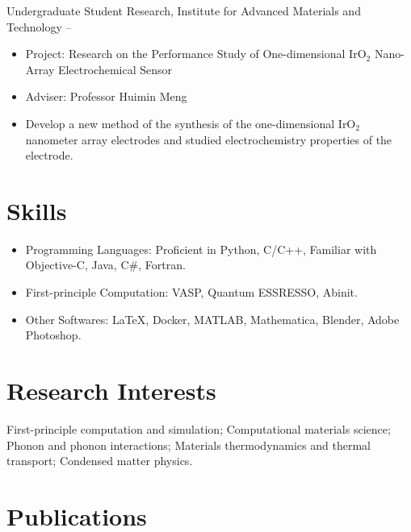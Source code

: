 \documentclass[
  a4paper,
  12pt
]{cv}
\begin{document}

\vspace{.25em}
Undergraduate Student Research, 
Institute for Advanced Materials and Technology
\hfill
{} --
\begin{itemize}
\item Project: Research on the Performance Study of One-dimensional IrO$_{2}$ Nano-Array Electrochemical Sensor
\item Adviser: Professor Huimin Meng
\item Develop a new method of the synthesis of the one-dimensional IrO$_{2}$ nanometer array electrodes and studied electrochemistry properties of the electrode.
\end{itemize}


\section{Skills}
\begin{itemize}
\item
Programming Languages:   
Proficient in
Python, C/C++, 
Familiar with Objective-C, Java, C\#, Fortran.
\item
First-principle Computation:   
VASP, Quantum ESSRESSO, Abinit.
\item
Other Softwares:    
{\LaTeX}, 
Docker,
MATLAB, 
Mathematica, 
Blender,
Adobe Photoshop.
\end{itemize}


\section{Research Interests}
First-principle computation and simulation;
Computational materials science;
Phonon and phonon interactions; 
Materials thermodynamics and thermal transport;
Condensed matter physics.


\section{Publications}
\end{document}
